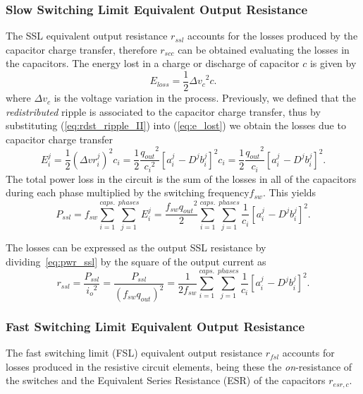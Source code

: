 \subsubsection[SSL]{Slow Switching Limit Equivalent Output Resistance}

The SSL equivalent output resistance $r_{ssl}$ accounts for the losses produced by the capacitor charge transfer, therefore $r_{scc}$ can be obtained evaluating the losses in the capacitors.  The energy lost in a charge or discharge of capacitor $c$ is given by
\begin{equation}
E_{loss}=\frac{1}{2}{{\Delta{v}}_c}^2 c.
\label{eq:e_lost}
\end{equation}
where $\Delta v_c$ is the voltage variation in the process. Previously, we defined that the \emph{redistributed} ripple is associated to the capacitor charge transfer, thus by substituting (\ref{eq:rdst_ripple_II}) into (\ref{eq:e_lost}) we obtain the losses due to capacitor charge transfer
\begin{equation}
E_i^j=\frac{1}{2}{({\Delta{vr}}_i^j)}^2 c_i = \frac{1}{2}\frac{{q_{out}}^2}{{c_i}^2}{\left[a_{i\
}^j-{D^j} {b_i^j}\right]}^2c_i=\frac{1}{2}\frac{{q_{out}}^2}{c_i}{\left[a_{i\
}^j-{D^j} {b_i^j}\right]}^2 .
\label{eq:e_lost_ssl}
\end{equation}
The total power loss in the circuit is the sum of the losses in all of the
capacitors during each phase multiplied by the switching frequency$f_{sw}$.
This yield{\small s}
\begin{equation}
P_{ssl}= f_{sw} \sum_{i=1}^{caps.}\sum_{j=1}^{phases} E_i^j =\frac{f_{sw}{q_{out}}^2}{2}\sum_{i=1}^{caps.}\sum_{j=1}^{phases}\frac{1}{c_i}{\left[a_{i\
}^j-{D^j}{b_i^j}\right]}^2.
\label{eq:pwr_ssl}
\end{equation}

The losses can be expressed as the output SSL resistance by dividing~\eqref{eq:pwr_ssl} by the
square of the output current as
\begin{equation}
r_{ssl}=\frac{P_{ssl}}{{i_o}^2}=\frac{P_{ssl}}{{(f_{sw} {q_{out}})}^2}=\frac{1}{2 f_{sw}}\sum_{i=1}^{caps.}\sum_{j=1}^{phases}\frac{1}{c_i}{\left[a_{i\
}^j-{D^j} {b_i^j}\right]}^2.
\label{eq:r_ssl}
\end{equation}


\subsubsection[FSL]{Fast Switching Limit Equivalent Output Resistance}
The fast switching limit (FSL) equivalent output resistance $r_{fsl}$ accounts for losses produced in the resistive circuit elements, being these the \emph{on}-resistance of the switches and the Equivalent Series Resistance (ESR) of the capacitors $r_{esr,c}$.


